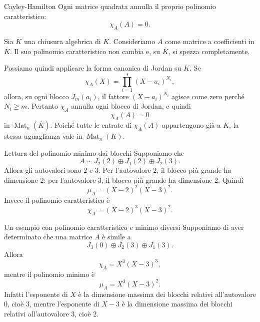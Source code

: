 \documentclass[a4paper]{article}
\begin{document}
\begin{radioactive}
\begin{snippetcorollary}{Cayley-Hamilton}
    Ogni matrice quadrata annulla il proprio polinomio caratteristico:
    \[
        \chi_A(A)=0.
    \]
\end{snippetcorollary}
\end{radioactive}

\begin{radioactive}
\begin{snippetproof}{}
    Sia \(\overline{K}\) una chiusura algebrica di \(K\). Consideriamo \(A\) come matrice a coefficienti in \(\overline{K}\). Il suo polinomio caratteristico non cambia e, su \(\overline{K}\), si spezza completamente.

    Possiamo quindi applicare la forma canonica di Jordan su \(\overline{K}\). Se
    \[
        \chi_A(X)
        =
        \prod_{i=1}^s (X-a_i)^{N_i},
    \]
    allora, su ogni blocco \(J_m(a_i)\), il fattore \((X-a_i)^{N_i}\) agisce come zero perché \(N_i\geq m\). Pertanto \(\chi_A\) annulla ogni blocco di Jordan, e quindi
    \[
        \chi_A(A)=0
    \]
    in \(\operatorname{Mat}_n(\overline{K})\). Poiché tutte le entrate di \(\chi_A(A)\) appartengono già a \(K\), la stessa uguaglianza vale in \(\operatorname{Mat}_n(K)\).
\end{snippetproof}
\end{radioactive}

\begin{radioactive}
\begin{snippetexample}{Lettura del polinomio minimo dai blocchi}
    Supponiamo che
    \[
        A\sim J_2(2)\oplus J_1(2)\oplus J_2(3).
    \]
    Allora gli autovalori sono \(2\) e \(3\). Per l'autovalore \(2\), il blocco più grande ha dimensione \(2\); per l'autovalore \(3\), il blocco più grande ha dimensione \(2\). Quindi
    \[
        \mu_A=(X-2)^2(X-3)^2.
    \]
    Invece il polinomio caratteristico è
    \[
        \chi_A=(X-2)^3(X-3)^2.
    \]
\end{snippetexample}
\end{radioactive}

\begin{radioactive}
\begin{snippetexample}{Un esempio con polinomio caratteristico e minimo diversi}
    Supponiamo di aver determinato che una matrice \(A\) è simile a
    \[
        J_3(0)\oplus J_2(3)\oplus J_1(3).
    \]
    Allora
    \[
        \chi_A=X^3(X-3)^3,
    \]
    mentre il polinomio minimo è
    \[
        \mu_A=X^3(X-3)^2.
    \]
    Infatti l'esponente di \(X\) è la dimensione massima dei blocchi relativi all'autovalore \(0\), cioè \(3\), mentre l'esponente di \(X-3\) è la dimensione massima dei blocchi relativi all'autovalore \(3\), cioè \(2\).
\end{snippetexample}
\end{radioactive}
\end{document}
